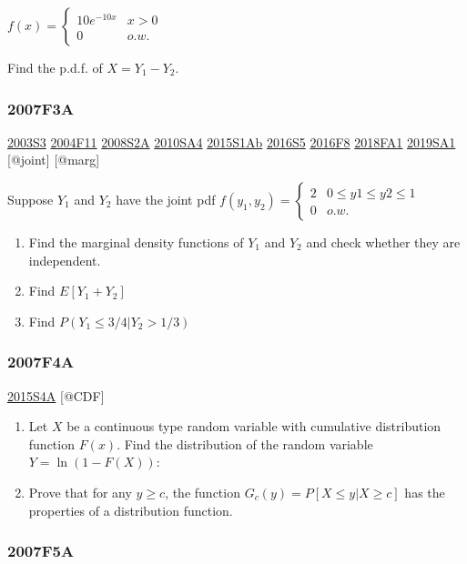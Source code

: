 \documentclass[6pt,twocolumn,Portrait]{article}
\begin{document}
\(f(x)=\begin{cases}10e^{-10x}& x>0\\0& o.w.\end{cases}\)

Find the p.d.f. of \(X=Y_1-Y_2\).

\hypertarget{f3a}{%
\subsubsection{2007F3A}\label{f3a}}

\protect\hyperlink{s3}{2003S3} \protect\hyperlink{f11}{2004F11}
\protect\hyperlink{s2a}{2008S2A} \protect\hyperlink{sa4-1}{2010SA4}
\protect\hyperlink{s1ab}{2015S1Ab} \protect\hyperlink{s5-4}{2016S5}
\protect\hyperlink{f8-4}{2016F8} \protect\hyperlink{fa1-4}{2018FA1}
\protect\hyperlink{sa1-3}{2019SA1} {[}@joint{]} {[}@marg{]}

Suppose \(Y_1\) and \(Y_2\) have the joint pdf
\(f(y_1,y_2)=\begin{cases}2&0\le y1\le y2\le 1\\0& o.w.\end{cases}\)

\begin{enumerate}
\def\labelenumi{(\alph{enumi})}
\item
  Find the marginal density functions of \(Y_1\) and \(Y_2\) and check
  whether they are independent.
\item
  Find \(E[Y_1+Y_2]\)
\item
  Find \(P(Y_1\le3/4|Y_2>1/3)\)
\end{enumerate}

\hypertarget{f4a}{%
\subsubsection{2007F4A}\label{f4a}}

\protect\hyperlink{s4a-1}{2015S4A} {[}@CDF{]}

\begin{enumerate}
\def\labelenumi{(\alph{enumi})}
\item
  Let \(X\) be a continuous type random variable with cumulative
  distribution function \(F(x)\). Find the distribution of the random
  variable \(Y=\ln(1-F(X))\):
\item
  Prove that for any \(y\ge c\), the function
  \(G_c(y)=P[X\le y|X\ge c]\) has the properties of a distribution
  function.
\end{enumerate}

\hypertarget{f5a}{%
\subsubsection{2007F5A}\label{f5a}}
\end{document}
